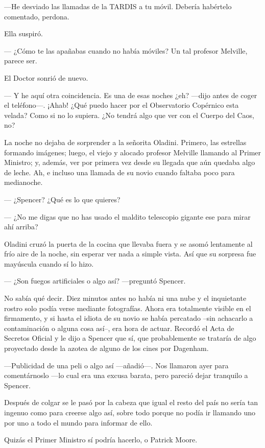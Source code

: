 ---He desviado las llamadas de la TARDIS a tu móvil. Debería habértelo
comentado, perdona.

Ella suspiró.

--- ¿Cómo te las apañabas cuando no había móviles? Un tal profesor
Melville, parece ser.

El Doctor sonrió de nuevo.

--- Y he aquí otra coincidencia. Es una de esas noches ¿eh? ---dijo
antes de coger el teléfono---. ¡Ahab! ¿Qué puedo hacer por el
Observatorio Copérnico esta velada? Como si no lo supiera. ¿No tendrá
algo que ver con el Cuerpo del Caos, no?

La noche no dejaba de sorprender a la señorita Oladini. Primero, las
estrellas formando imágenes; luego, el viejo y alocado profesor Melville
llamando al Primer Ministro; y, además, ver por primera vez desde su
llegada que aún quedaba algo de leche. Ah, e incluso una llamada de su
novio cuando faltaba poco para medianoche.

--- ¿Spencer? ¿Qué es lo que quieres?

---  ¿No me digas que no has usado el maldito telescopio gigante ese para
mirar ahí arriba?

Oladini cruzó la puerta de la cocina que llevaba fuera y se asomó
lentamente al frío aire de la noche, sin esperar ver nada a simple
vista. Así que su sorpresa fue mayúscula cuando sí lo hizo.

--- ¿Son fuegos artificiales o algo así? ---preguntó Spencer.

No sabía qué decir. Diez minutos antes no había ni una nube y el
inquietante rostro solo podía verse mediante fotografías. Ahora era
totalmente visible en el firmamento, y si hasta el idiota de su novio se
había percatado --sin achacarlo a contaminación o alguna cosa así--, era
hora de actuar. Recordó el Acta de Secretos Oficial y le dijo a Spencer
que sí, que probablemente se trataría de algo proyectado desde la azotea
de alguno de los cines por Dagenham.

---Publicidad de una peli o algo así ---añadió---. Nos llamaron ayer
para comentárnoslo ---lo cual era una excusa barata, pero pareció dejar
tranquilo a Spencer.

Después de colgar se le pasó por la cabeza que igual el resto del país
no sería tan ingenuo como para creerse algo así, sobre todo porque no
podía ir llamando uno por uno a todo el mundo para informar de ello.

Quizás el Primer Ministro sí podría hacerlo, o Patrick Moore.

